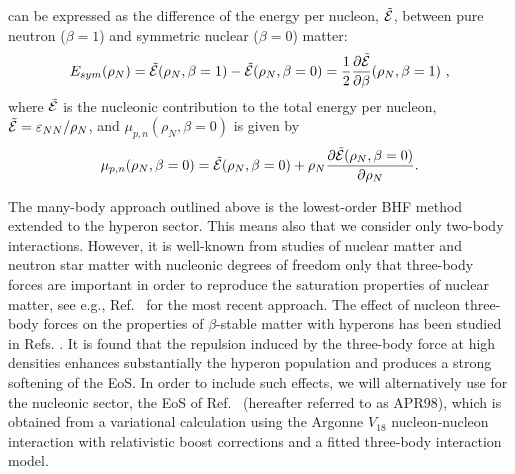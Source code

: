 can be expressed as the difference of the energy per nucleon, $\tilde{\cal E}$,
between pure neutron
($\beta=1$) and symmetric nuclear ($\beta=0$) matter:
\begin{equation}
E_{sym}(\rho_N)=\tilde{\cal E}(\rho_N,\beta=1)-\tilde{\cal
E}(\rho_N,\beta=0)=\frac{1}{2}\frac{\partial
\tilde{\cal
E}}{\partial \beta}(\rho_N, \beta=1) \ ,
\end{equation}
where $\tilde{\cal E}$ is the nucleonic contribution to the total
energy per nucleon, $ \tilde{\cal E} = \varepsilon_{NN}/\rho_N$, and
$\mu_{p,n}(\rho_N,\beta=0)$ is given by
\begin{equation}
\mu_{p,n}(\rho_N,\beta=0)=\tilde{\cal E}(\rho_N,\beta=0)+
\rho_N\frac{\partial \tilde{\cal
E}(\rho_N,\beta=0)}{\partial \rho_N}.
\end{equation}



The many-body approach outlined above is the lowest-order
BHF method extended to the hyperon sector.
This means also that we consider only
two-body interactions. However, it is well-known from studies of nuclear
matter and neutron star matter with nucleonic degrees of freedom only
that three-body forces are important in 
order to reproduce the saturation 
properties of nuclear matter, see e.g., Ref.\ \cite{apr98} for the most 
recent
approach.  
The effect of nucleon three-body forces on the properties of
$\beta$-stable matter with hyperons has been studied in 
Refs. \cite{bbs98,bbs00}. It is found that the repulsion induced
by the three-body force at high densities enhances
substantially the hyperon population and produces a strong
softening of the EoS.
In order to include such effects, we will alternatively use for the nucleonic sector,
the EoS of Ref.\ \cite{apr98} (hereafter referred to as APR98), which is
obtained from a variational calculation using the Argonne $V_{18}$
nucleon-nucleon interaction \cite{v18} with relativistic boost corrections
and a fitted three-body interaction model. 

